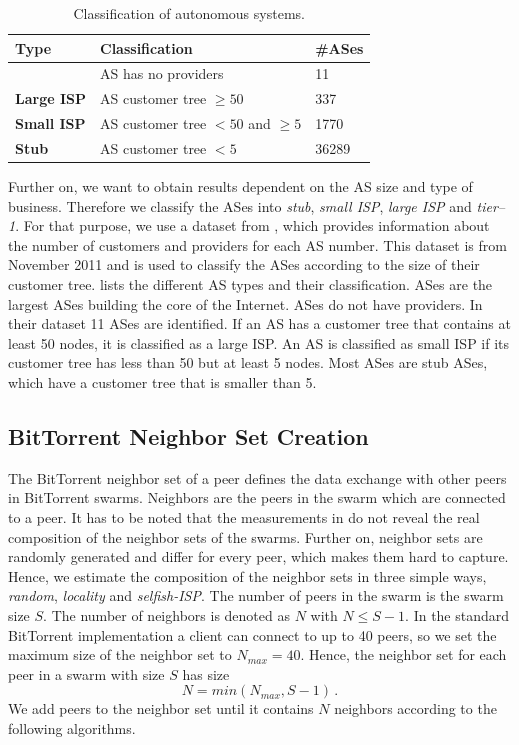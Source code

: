 \begin{table}[tb]
\caption{Classification of autonomous systems.} \label{tab:ASclass}
\begin{center}
{\footnotesize
	\begin{tabular}{|l|l|l|} \hline
		\textbf{Type} & \textbf{Classification} & \textbf{\#ASes} \\ \hline
		\textbf{\Tier} & AS has no providers & 11 \\ \hline
		\textbf{Large ISP} & AS customer tree $\geq50$ & 337 \\ \hline
		\textbf{Small ISP} & AS customer tree $<50$ and $\geq5$ & 1770 \\ \hline
		\textbf{Stub} & AS customer tree $<5$ & 36289 \\ \hline
	\end{tabular}
}
\end{center}
\end{table}

Further on, we want to obtain results dependent on the AS size and type of business. Therefore we classify the ASes into \textit{stub}, \textit{small ISP}, \textit{large ISP} and \textit{tier--1}. For that purpose, we use a dataset from \cite{irlas}, which provides information about the number of customers and providers for each AS number. This dataset is from November 2011 and is used to classify the ASes according to the size of their customer tree.
 lists the different AS types and their classification. \Tier ASes are the largest ASes building the core of the Internet. \Tier ASes do not have providers. In their dataset 11 \tier ASes are identified. If an AS has a customer tree that contains at least 50 nodes, it is classified as a large ISP. An AS is classified as small ISP if its customer tree has less than 50 but at least 5 nodes. Most ASes are stub ASes, which have a customer tree that is smaller than 5. 

\subsection{BitTorrent Neighbor Set Creation}

The BitTorrent neighbor set of a peer defines the data exchange with other peers in BitTorrent swarms. Neighbors are the peers in the swarm which are connected to a peer. It has to be noted that the measurements in \cite{Hossfeld2011} do not reveal the real composition of the neighbor sets of the swarms. Further on, neighbor sets are randomly generated and differ for every peer, which makes them hard to capture. Hence, we estimate the composition of the neighbor sets in three simple ways, \textit{random}, \textit{locality} and \textit{selfish-ISP}.
The number of peers in the swarm is the swarm size $S$. The number of neighbors is denoted as $N$ with $N\leq S-1$. In the standard BitTorrent implementation a client can connect to up to 40 peers, so we set the maximum size of the neighbor set to $N_{max}=40$. Hence, the neighbor set for each peer in a swarm with size $S$ has size 
\begin{equation}
N=min(N_{max},S-1) \, .
\end{equation}
We add peers to the neighbor set until it contains $N$ neighbors according to the following algorithms.
